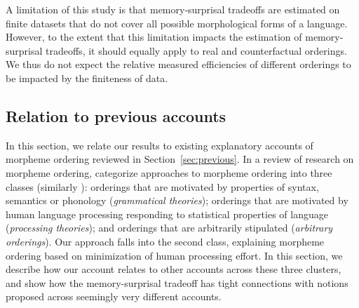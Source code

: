 \documentclass[man]{apa7}
\newcommand{\citet}{\Textcite}
\begin{document}

A limitation of this study is that memory-surprisal tradeoffs are estimated on finite datasets that do not cover all possible morphological forms of a language. However, to the extent that this limitation impacts the estimation of memory-surprisal tradeoffs, it should equally apply to real and counterfactual orderings. We thus do not expect the relative measured efficiencies of different orderings to be impacted by the finiteness of data.




\subsection{Relation to previous accounts}


In this section, we relate our results to existing explanatory accounts of morpheme ordering reviewed in Section~\ref{sec:previous}.
In a review of research on morpheme ordering, \citet{manova2010modeling} %
categorize approaches to morpheme ordering into three classes (similarly \citet{rice2000morpheme, rice2011principles}): orderings that are motivated by properties of syntax, semantics or phonology (\textit{grammatical theories}); orderings that are motivated by human language processing responding to statistical properties of language (\textit{processing theories}); and orderings that are arbitrarily stipulated  (\textit{arbitrary orderings}).
Our approach falls into the second class, explaining morpheme ordering based on minimization of human processing effort.
In this section, we describe how our account relates to other accounts across these three clusters, and show how the memory-surprisal tradeoff has tight connections with notions proposed across seemingly very different accounts.

\end{document}
